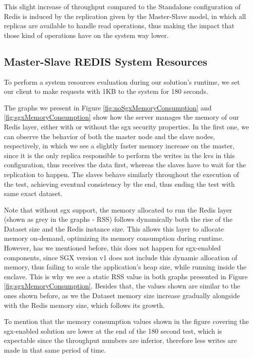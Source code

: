 This slight increase of throughput compared to the Standalone configuration of Redis is induced by the replication given by the Master-Slave model, in which all replicas are available to handle read operations, thus making the impact that those kind of operations have on the system way lower.   


\subsection{Master-Slave REDIS System Resources}

To perform a system resources evaluation during our solution's runtime, we set our client to make requests with 1KB to the system for 180 seconds.  

The graphs we present in Figure \ref{fig:noSgxMemoryConsumption} and \ref{fig:sgxMemoryConsumption} show how the server manages the memory of our Redis layer, either with or without the \gls{sgx} security properties. 
In the first one, we can observe the behavior of both the master node and the slave nodes, respectively, in which we see a slightly faster memory increase on the master, since it is the only replica responsible to perform the writes in the \gls{kvs} in this configuration, thus receives the data first, whereas the slaves have to wait for the replication to happen. 
The slaves behave similarly throughout the execution of the test, achieving eventual consistency by the end, thus ending the test with same exact dataset. 

Note that without \gls{sgx} support, the memory allocated to run the Redis layer (shown as grey in the graphs - RSS) follows dynamically both the rise of the Dataset size and the Redis instance size. This allows this layer to allocate memory on-demand, optimizing its memory consumption during runtime. However, has we mentioned before, this does not happen for \gls{sgx}-enabled components, since SGX version v1 does not include this dynamic allocation of memory, thus failing to scale the application's heap size, while running inside the enclave. This is why we see a static RSS value in both graphs presented in Figure \ref{fig:sgxMemoryConsumption}. Besides that, the values shown are similar to the ones shown before, as we the Dataset memory size increase gradually alongside with the Redis memory size, which follows its growth. 

To mention that the memory consumption values shown in the figure covering the \gls{sgx}-enabled solution are lower at the end of the 180 second test, which is expectable since the throughput numbers are inferior, therefore less writes are made in that same period of time.

